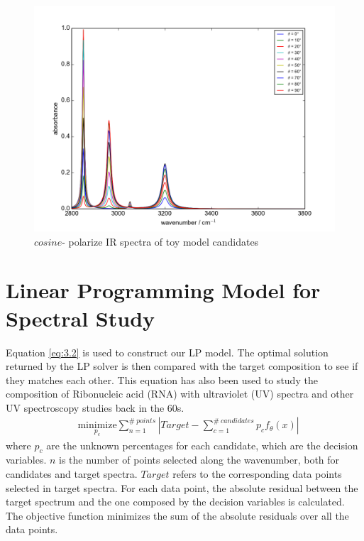 \begin{figure}[!ht] 
\centering
\includegraphics[scale=0.7]{Figures/Toy_Model_IR_Cosine_Projection.png} 
\caption{$cosine$- polarize IR spectra of toy model candidates} \label{fig:3.1}
\end{figure}


\section{Linear Programming Model for Spectral Study}

Equation \ref{eq:3.2} is used to construct our LP model. The optimal solution returned by the LP solver is then compared with the target composition to see if they matches each other. This equation has also been used to study the composition of Ribonucleic acid (RNA) with ultraviolet (UV) spectra \cite{NYAS:NYAS900} and other UV spectroscopy studies  \cite{LPATUAS} back in the 60s. \\

\begin{eqnarray} \label{eq:3.2}
& \underset{p_{c}} {\text{minimize}} \displaystyle\sum^{\#~points}_{n=1} \left| Target- \displaystyle\sum^{\#~candidates}_{c=1}p_{c}f_{\theta}(x) \right| 
\end{eqnarray}
where $p_{c}$ are the unknown percentages for each candidate, which are the decision variables. $n$ is the number of points selected along the wavenumber, both for candidates and target spectra. $Target$ refers to the corresponding data points selected in target spectra. For each data point, the absolute residual between the target spectrum and the one composed by the decision variables is calculated. The objective function minimizes the sum of the absolute residuals over all the data points. \\

